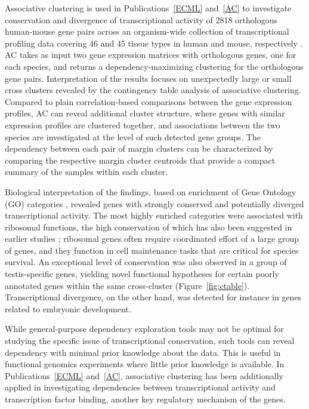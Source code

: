 Associative clustering is used in Publications~\ref{ECML} and~\ref{AC}
to investigate conservation and divergence of transcriptional activity
of 2818 orthologous human-mouse gene pairs across an organism-wide
collection of transcriptional profiling data covering 46 and 45 tissue
types in human and mouse, respectively \citep{Su02}. AC takes as input
two gene expression matrices with orthologous genes, one for each
species, and returns a dependency-maximizing clustering for the
orthologous gene pairs.  Interpretation of the results focuses on
unexpectedly large or small cross clusters revealed by the contingency
table analysis of associative clustering. Compared to plain
correlation-based comparisons between the gene expression profiles, AC
can reveal additional cluster structure, where genes with similar
expression profiles are clustered together, and associations between
the two species are investigated at the level of such detected gene
groups. The dependency between each pair of margin clusters can be
characterized by comparing the respective margin cluster centroids
that provide a compact summary of the samples within each cluster.

Biological interpretation of the findings, based on enrichment of Gene
Ontology (GO) categories \citep{Ashburner00}, revealed genes with
strongly conserved and potentially diverged transcriptional
activity. The most highly enriched categories were associated with
ribosomal functions, the high conservation of which has also been
suggested in earlier studies \citep{Jimenez02}; ribosomal genes often
require coordinated effort of a large group of genes, and they
function in cell maintenance tasks that are critical for species
survival.  An exceptional level of conservation was also observed in a
group of testis-specific genes, yielding novel functional hypotheses
for certain poorly annotated genes within the same cross-cluster
(Figure~\ref{fig:ctable}). Transcriptional divergence, on the other
hand, was detected for instance in genes related to embryonic
development.

While general-purpose dependency exploration tools may not be optimal
for studying the specific issue of transcriptional conservation, such
tools can reveal dependency with minimal prior knowledge about the
data. This is useful in functional genomics experiments where little
prior knowledge is available. In Publications~\ref{ECML} and~\ref{AC},
associative clustering has been additionally applied in investigating
dependencies between transcriptional activity and transcription factor
binding, another key regulatory mechanism of the genes.
